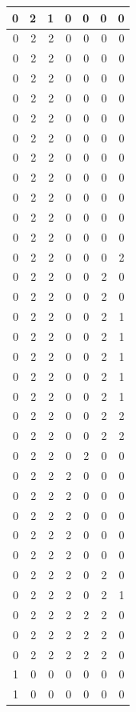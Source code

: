 \documentclass[
  12pt,
]{krantz}
\begin{document}
\begin{tabular}{r|r|r|r|r|r|r}
\hline
0 & 2 & 1 & 0 & 0 & 0 & 0\\
\hline
0 & 2 & 2 & 0 & 0 & 0 & 0\\
\hline
0 & 2 & 2 & 0 & 0 & 0 & 0\\
\hline
0 & 2 & 2 & 0 & 0 & 0 & 0\\
\hline
0 & 2 & 2 & 0 & 0 & 0 & 0\\
\hline
0 & 2 & 2 & 0 & 0 & 0 & 0\\
\hline
0 & 2 & 2 & 0 & 0 & 0 & 0\\
\hline
0 & 2 & 2 & 0 & 0 & 0 & 0\\
\hline
0 & 2 & 2 & 0 & 0 & 0 & 0\\
\hline
0 & 2 & 2 & 0 & 0 & 0 & 0\\
\hline
0 & 2 & 2 & 0 & 0 & 0 & 0\\
\hline
0 & 2 & 2 & 0 & 0 & 0 & 0\\
\hline
0 & 2 & 2 & 0 & 0 & 0 & 2\\
\hline
0 & 2 & 2 & 0 & 0 & 2 & 0\\
\hline
0 & 2 & 2 & 0 & 0 & 2 & 0\\
\hline
0 & 2 & 2 & 0 & 0 & 2 & 1\\
\hline
0 & 2 & 2 & 0 & 0 & 2 & 1\\
\hline
0 & 2 & 2 & 0 & 0 & 2 & 1\\
\hline
0 & 2 & 2 & 0 & 0 & 2 & 1\\
\hline
0 & 2 & 2 & 0 & 0 & 2 & 1\\
\hline
0 & 2 & 2 & 0 & 0 & 2 & 2\\
\hline
0 & 2 & 2 & 0 & 0 & 2 & 2\\
\hline
0 & 2 & 2 & 0 & 2 & 0 & 0\\
\hline
0 & 2 & 2 & 2 & 0 & 0 & 0\\
\hline
0 & 2 & 2 & 2 & 0 & 0 & 0\\
\hline
0 & 2 & 2 & 2 & 0 & 0 & 0\\
\hline
0 & 2 & 2 & 2 & 0 & 0 & 0\\
\hline
0 & 2 & 2 & 2 & 0 & 0 & 0\\
\hline
0 & 2 & 2 & 2 & 0 & 2 & 0\\
\hline
0 & 2 & 2 & 2 & 0 & 2 & 1\\
\hline
0 & 2 & 2 & 2 & 2 & 2 & 0\\
\hline
0 & 2 & 2 & 2 & 2 & 2 & 0\\
\hline
0 & 2 & 2 & 2 & 2 & 2 & 0\\
\hline
1 & 0 & 0 & 0 & 0 & 0 & 0\\
\hline
1 & 0 & 0 & 0 & 0 & 0 & 0\\

\end{tabular}
\end{document}
